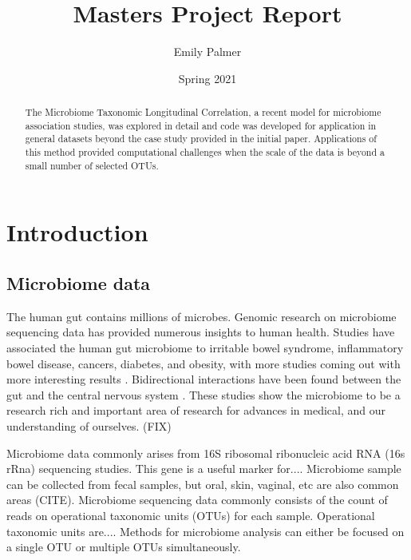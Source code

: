 \documentclass[12pt]{article}
\title{Masters Project Report}
\author{Emily Palmer}
\date{Spring 2021}
\begin{document}
\maketitle

\begin{abstract}
  The Microbiome Taxonomic Longitudinal Correlation, a recent model for microbiome association studies, was explored in detail and code was developed for application in general datasets beyond the case study provided in the initial paper. Applications of this method provided computational challenges when the scale of the data is beyond a small number of selected OTUs.
\end{abstract}




\section{Introduction}

\subsection{Microbiome data}
The human gut contains millions of microbes. Genomic research on microbiome sequencing data has provided numerous insights to human health. Studies have associated the human gut microbiome to irritable bowel syndrome, inflammatory bowel disease, cancers, diabetes, and obesity, with more studies coming out with more interesting results \cite{kinross2008human}. Bidirectional interactions have been found between the gut and the central nervous system \cite{mayer2015gut}. These studies show the microbiome to be a research rich and important area of research for advances in medical, and our understanding of ourselves. (FIX)

Microbiome data commonly arises from 16S ribosomal ribonucleic acid RNA (16s rRna) sequencing studies. This gene is a useful marker for.... Microbiome sample can be collected from fecal samples, but oral, skin, vaginal, etc are also common areas (CITE). Microbiome sequencing data commonly consists of the count of reads on operational taxonomic units (OTUs) for each sample. Operational taxonomic units are.... Methods for microbiome analysis can either be focused on a single OTU or multiple OTUs simultaneously.
\end{document}
